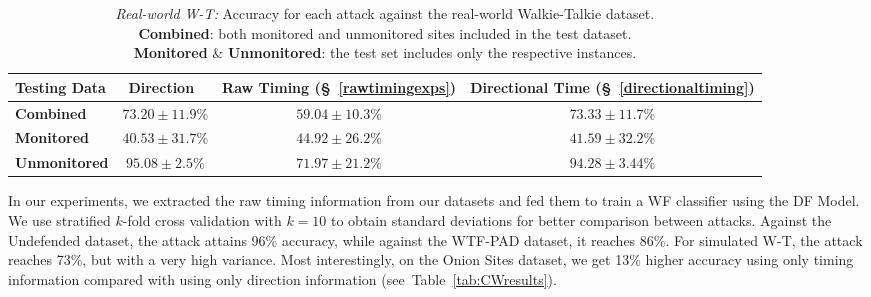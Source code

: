 \documentclass[USenglish,oneside,twocolumn]{article}
\begin{document}
\begin{table*}[th!]
\renewcommand{\arraystretch}{1.25}
  \begin{center}\vskip -0.3cm  
\caption{\emph{Real-world W-T:} Accuracy for each attack against the real-world Walkie-Talkie dataset.\\
\label{tab:wt-real}
\textbf{Combined}: both monitored and unmonitored sites included in the test dataset. \\
\textbf{Monitored} \& \textbf{Unmonitored}: the test set includes only the respective instances.}
\begin{tabular}{l c c c}
\textbf{Testing Data}         & \textbf{Direction}~\cite{Sirinam2018} & \textbf{Raw Timing} (\S~\ref{rawtimingexps}) & \textbf{Directional Time} (\S~\ref{directionaltiming})\\ \hline


\textbf{Combined}      & $73.20\pm11.9$\%     & $59.04\pm10.3$\%      & $73.33\pm11.7$\%            \\
\textbf{Monitored}    & $40.53\pm31.7$\%     & $44.92\pm26.2$\%      & $41.59\pm32.2$\%            \\
\textbf{Unmonitored} & $95.08\pm2.5$\%      & $71.97\pm21.2$\%      & $94.28\pm3.44$\%            \\  \hline
\end{tabular}
\end{center}
\end{table*}

%
 
In our experiments, we extracted the raw timing information from our datasets and fed them to train a WF classifier using the DF Model. We use stratified $k$-fold cross validation with $k=10$ to obtain standard deviations for better comparison between attacks. Against the Undefended dataset, the attack attains 96\% accuracy, while against the WTF-PAD dataset, it reaches 86\%. For simulated W-T, the attack reaches 73\%, but with a very high variance. Most interestingly, on the Onion Sites dataset, we get 13\% higher accuracy using only timing information compared with using only direction information (see~Table~\ref{tab:CWresults}).
\end{document}
